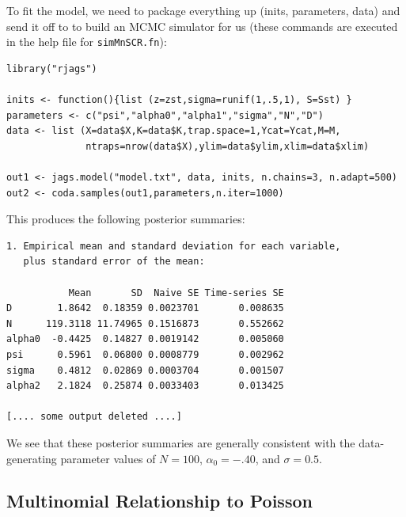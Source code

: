 To fit the model, we need to package everything up (inits, parameters, data) and send
it off to \jags to build an MCMC simulator for us (these commands are
executed in the help file for \mbox{\tt simMnSCR.fn}):
{\small
\begin{verbatim}
library("rjags")

inits <- function(){list (z=zst,sigma=runif(1,.5,1), S=Sst) }
parameters <- c("psi","alpha0","alpha1","sigma","N","D")
data <- list (X=data$X,K=data$K,trap.space=1,Ycat=Ycat,M=M,
              ntraps=nrow(data$X),ylim=data$ylim,xlim=data$xlim)

out1 <- jags.model("model.txt", data, inits, n.chains=3, n.adapt=500)
out2 <- coda.samples(out1,parameters,n.iter=1000)
\end{verbatim}
}
This produces the following posterior summaries:
{\small
\begin{verbatim}
1. Empirical mean and standard deviation for each variable,
   plus standard error of the mean:

           Mean       SD  Naive SE Time-series SE
D        1.8642  0.18359 0.0023701       0.008635
N      119.3118 11.74965 0.1516873       0.552662
alpha0  -0.4425  0.14827 0.0019142       0.005060
psi      0.5961  0.06800 0.0008779       0.002962
sigma    0.4812  0.02869 0.0003704       0.001507
alpha2   2.1824  0.25874 0.0033403       0.013425

[.... some output deleted ....]
\end{verbatim}
}
We see that these posterior summaries are generally
consistent with the data-generating parameter values of
$N=100$, $\alpha_{0}= -.40$, and $\sigma=0.5$.


\subsection{Multinomial Relationship to Poisson}

